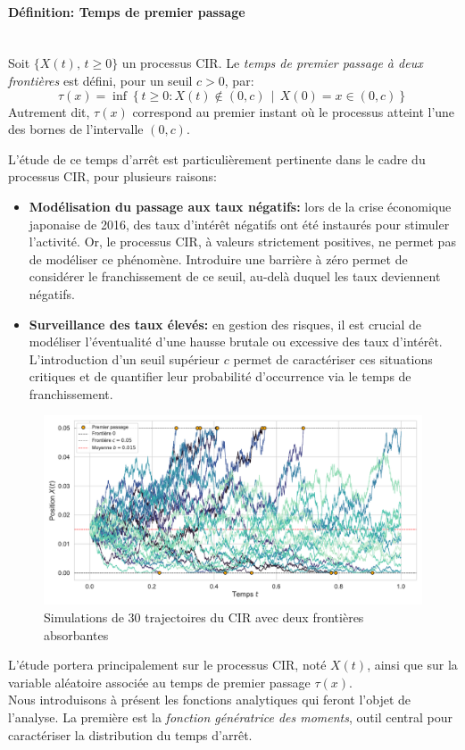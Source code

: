 \paragraph{Définition: Temps de premier passage}\mbox{}\\
Soit $\{X(t),\, t \geq 0\}$ un processus \acs{CIR}. Le \textit{temps de premier passage à deux frontières} est défini, pour un seuil $c > 0$, par:
\begin{equation}\label{fpt_definition}
    \tau(x) = \inf \left\{ t \geq 0: X(t) \notin (0, c) \,\middle|\, X(0) = x \in (0, c) \right\}
\end{equation}
Autrement dit, $\tau(x)$ correspond au premier instant où le processus atteint l'une des bornes de l'intervalle $(0, c)$. 

L'étude de ce temps d'arrêt est particulièrement pertinente dans le cadre du processus \acs{CIR}, pour plusieurs raisons:
\begin{itemize}
    \item \textbf{Modélisation du passage aux taux négatifs:} lors de la crise économique japonaise de 2016, des taux d'intérêt négatifs ont été instaurés pour stimuler l'activité. Or, le processus \acs{CIR}, à valeurs strictement positives, ne permet pas de modéliser ce phénomène. Introduire une barrière à zéro permet de considérer le franchissement de ce seuil, au-delà duquel les taux deviennent négatifs.
    \item \textbf{Surveillance des taux élevés:} en gestion des risques, il est crucial de modéliser l'éventualité d'une hausse brutale ou excessive des taux d'intérêt. L'introduction d'un seuil supérieur $c$ permet de caractériser ces situations critiques et de quantifier leur probabilité d'occurrence via le temps de franchissement.
\end{itemize}
\begin{figure}[htb]
    \centering
    \includegraphics[width=0.9\linewidth]{img/intro/cir_first_passage.pdf}
    \caption{Simulations de 30 trajectoires du \acs{CIR} avec deux frontières absorbantes}\label{fig:FPTCIR}
\end{figure}
\FloatBarrier L'étude portera principalement sur le processus \acs{CIR}, noté $X(t)$, ainsi que sur la variable aléatoire associée au temps de premier passage $\tau(x)$.\\
Nous introduisons à présent les fonctions analytiques qui feront l'objet de l'analyse. La première est la \textit{fonction génératrice des moments}, outil central pour caractériser la distribution du temps d'arrêt.
